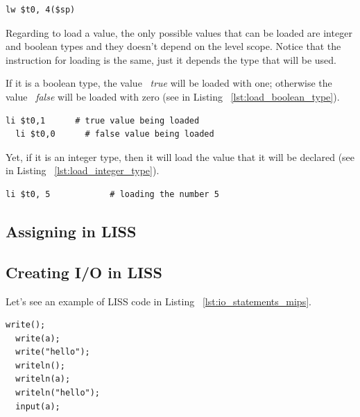 \documentclass[
  oneside,
  11pt, a4paper,
  footinclude=true,
  headinclude=true,
  cleardoublepage=empty
]{scrbook}
\begin{document}
\begin{lstlisting}[caption={Loading a variable with level scope greater than zero},label={lst:load_variable_level_scope_great_0}]
  lw $t0, 4($sp)
\end{lstlisting}

Regarding to load a value, the only possible values that can be loaded are integer and boolean types and they doesn't depend on the level scope.
Notice that the instruction for loading is the same, just it depends the type that will be used.

If it is a boolean type, the value ~\textit{true} will be loaded with one; otherwise the value ~\textit{false} will be loaded with zero (see in Listing ~\ref{lst:load_boolean_type}).

\begin{lstlisting}[caption={Loading a boolean value},label={lst:load_boolean_type}]
  li $t0,1		# true value being loaded
  li $t0,0		# false value being loaded
\end{lstlisting}

Yet, if it is an integer type, then it will load the value that it will be declared (see in Listing ~\ref{lst:load_integer_type}).

\begin{lstlisting}[caption={Loading an integer value},label={lst:load_integer_type}]
  li $t0, 5            # loading the number 5
\end{lstlisting}

\subsection{Assigning in LISS}




\subsection{Creating I/O in LISS}


Let's see an example of LISS code in Listing ~\ref{lst:io_statements_mips}.

\begin{lstlisting}[caption={Example of I/O statements in LISS},label={lst:io_statements_mips}]
  write();
  write(a);
  write("hello");
  writeln();
  writeln(a);
  writeln("hello");
  input(a);
\end{lstlisting}
\end{document}
